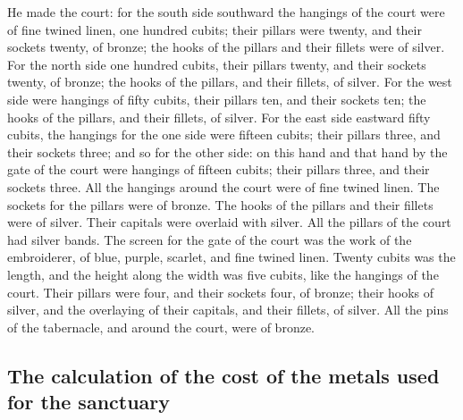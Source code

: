  He made the court: for the south side southward the
hangings of the court were of fine twined linen, one hundred cubits;
 their pillars were twenty, and their sockets twenty, of
bronze; the hooks of the pillars and their fillets were of silver.
 For the north side one hundred cubits, their pillars
twenty, and their sockets twenty, of bronze; the hooks of the pillars,
and their fillets, of silver.  For the west side were
hangings of fifty cubits, their pillars ten, and their sockets ten; the
hooks of the pillars, and their fillets, of silver.  For
the east side eastward fifty cubits,  the hangings for
the one side were fifteen cubits; their pillars three, and their sockets
three;  and so for the other side: on this hand and that
hand by the gate of the court were hangings of fifteen cubits; their
pillars three, and their sockets three.  All the hangings
around the court were of fine twined linen.  The sockets
for the pillars were of bronze. The hooks of the pillars and their
fillets were of silver. Their capitals were overlaid with silver. All
the pillars of the court had silver bands.  The screen
for the gate of the court was the work of the embroiderer, of blue,
purple, scarlet, and fine twined linen. Twenty cubits was the length,
and the height along the width was five cubits, like the hangings of the
court.  Their pillars were four, and their sockets four,
of bronze; their hooks of silver, and the overlaying of their capitals,
and their fillets, of silver.  All the pins of the
tabernacle, and around the court, were of bronze.

\hypertarget{the-calculation-of-the-cost-of-the-metals-used-for-the-sanctuary}{%
\subsection{The calculation of the cost of the metals used for the
sanctuary}\label{the-calculation-of-the-cost-of-the-metals-used-for-the-sanctuary}}

